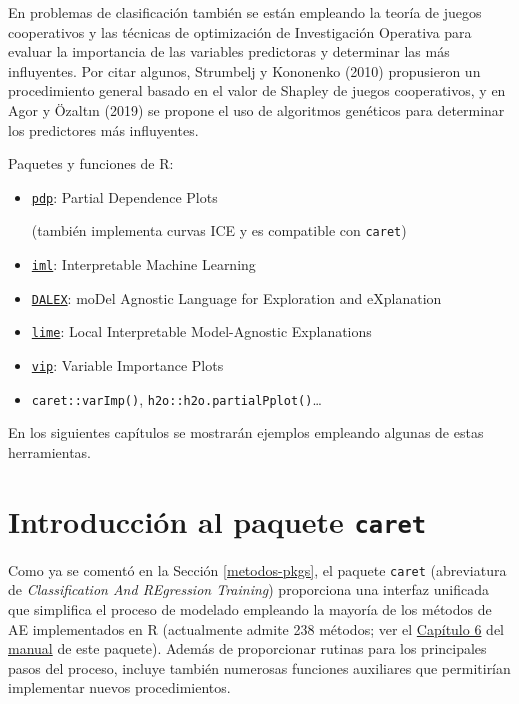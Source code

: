 \documentclass[
]{book}
\theoremstyle{break}
\theoremstyle{definition}
\theoremstyle{definition}
\theoremstyle{definition}
\theoremstyle{remark}
\begin{document}
En problemas de clasificación también se están empleando la teoría de juegos cooperativos y las técnicas de optimización de Investigación Operativa para evaluar la importancia de las variables predictoras y determinar las más influyentes.
Por citar algunos, Strumbelj y Kononenko (2010) propusieron un procedimiento general basado en el valor de Shapley de juegos cooperativos, y en Agor y Özaltın (2019) se propone el uso de algoritmos genéticos para determinar los predictores más influyentes.

Paquetes y funciones de R:

\begin{itemize}
\item
  \href{https://bgreenwell.github.io/pdp/index.html}{\texttt{pdp}}: Partial Dependence Plots

  (también implementa curvas ICE y es compatible con \texttt{caret})
\item
  \href{https://christophm.github.io/iml}{\texttt{iml}}: Interpretable Machine Learning
\item
  \href{https://modeloriented.github.io/DALEX}{\texttt{DALEX}}: moDel Agnostic Language for Exploration and eXplanation
\item
  \href{https://lime.data-imaginist.com}{\texttt{lime}}: Local Interpretable Model-Agnostic Explanations
\item
  \href{https://koalaverse.github.io/vip/index.html}{\texttt{vip}}: Variable Importance Plots
\item
  \texttt{caret::varImp()}, \texttt{h2o::h2o.partialPplot()}\ldots{}
\end{itemize}

En los siguientes capítulos se mostrarán ejemplos empleando algunas de estas herramientas.

\hypertarget{caret}{%
\section{\texorpdfstring{Introducción al paquete \texttt{caret}}{Introducción al paquete caret}}\label{caret}}

Como ya se comentó en la Sección \ref{metodos-pkgs}, el paquete \texttt{caret} (abreviatura de \emph{Classification And REgression Training}) proporciona una interfaz unificada que simplifica el proceso de modelado empleando la mayoría de los métodos de AE implementados en R (actualmente admite 238 métodos; ver el \href{https://topepo.github.io/caret/available-models.html}{Capítulo 6} del \href{https://topepo.github.io/caret}{manual} de este paquete).
Además de proporcionar rutinas para los principales pasos del proceso, incluye también numerosas funciones auxiliares que permitirían implementar nuevos procedimientos.
\end{document}
